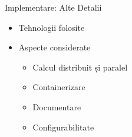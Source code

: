 \begin{frame}{Implementare: Alte Detalii} \pause
    \begin{itemize}
        \item Tehnologii folosite
        \vspace{0.3cm}
        
        \vspace{0.3cm} \pause
	    \item Aspecte considerate \pause
	    \begin{itemize}
    	    \item Calcul distribuit și paralel \pause
    	    \item Containerizare \pause
    	    \item Documentare \pause
    	    \item Configurabilitate
    	\end{itemize}
	\end{itemize}
\end{frame}